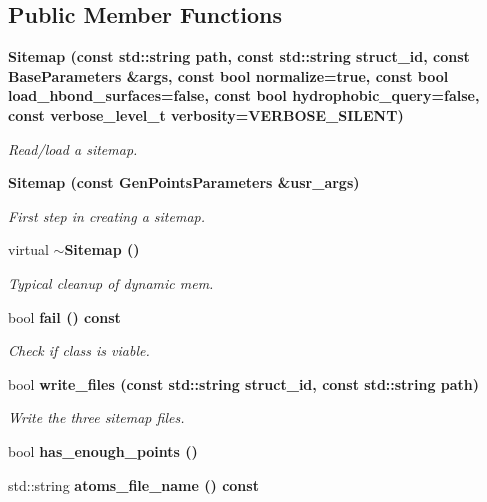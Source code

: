 \subsection*{Public Member Functions}
\begin{CompactItemize}
\item 
\bf{Sitemap} (const std::string path, const std::string struct\_\-id, const \bf{Base\-Parameters} \&args, const bool normalize=true, const bool load\_\-hbond\_\-surfaces=false, const bool hydrophobic\_\-query=false, const verbose\_\-level\_\-t verbosity=VERBOSE\_\-SILENT)\label{classASCbase_1_1Sitemap_50c5a65ec5c3b1e196466431ab71637a}

\begin{CompactList}\small\item\em Read/load a sitemap. \item\end{CompactList}\item 
\bf{Sitemap} (const \bf{Gen\-Points\-Parameters} \&usr\_\-args)\label{classASCbase_1_1Sitemap_fc5a254b492d94440c55970ef63386f2}

\begin{CompactList}\small\item\em First step in creating a sitemap. \item\end{CompactList}\item 
virtual \bf{$\sim$Sitemap} ()\label{classASCbase_1_1Sitemap_efd8a95708982d72800caf7f69073700}

\begin{CompactList}\small\item\em Typical cleanup of dynamic mem. \item\end{CompactList}\item 
bool \bf{fail} () const 
\begin{CompactList}\small\item\em Check if class is viable. \item\end{CompactList}\item 
bool \bf{write\_\-files} (const std::string struct\_\-id, const std::string path)\label{classASCbase_1_1Sitemap_88720d257d371462b7fc1b8c797aa697}

\begin{CompactList}\small\item\em Write the three sitemap files. \item\end{CompactList}\item 
bool \bf{has\_\-enough\_\-points} ()
\item 
std::string \bf{atoms\_\-file\_\-name} () const \label{classASCbase_1_1Sitemap_aaf9fd841e8f5a03b2b7b756240bbe82}


\end{CompactItemize}
